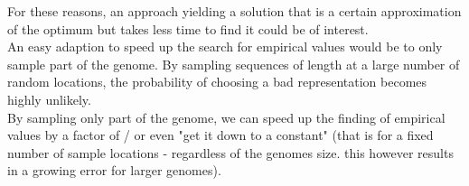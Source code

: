 For these reasons, an approach yielding a solution that is a certain approximation of the optimum but takes less time to find it could be of interest.\\
An easy adaption  to speed up the search for empirical values would be to only sample part of the genome. By sampling sequences of length  at a large  number of random locations, the probability of choosing a bad representation becomes highly unlikely.\\
By sampling only part of the genome, we can speed up the finding of empirical values by a factor of  / or even "get it down to a constant" (that is for a fixed number of sample locations - regardless of the genomes size. this however results in a growing error for larger genomes).\\